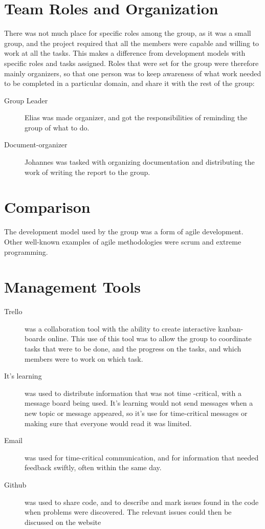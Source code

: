 \section{Team Roles and Organization}
There was not much place for specific roles among the group, as it was a small group, and the project required that all the members were capable and willing to work at all the tasks. This makes a difference from development models with specific roles and tasks assigned. Roles that were set for the group were therefore mainly organizers, so that one person was to keep awareness of what work needed to be completed in a particular domain, and share it with the rest of the group:

\begin{description}

\item[Group Leader] Elias was made organizer, and got the responsibilities of reminding the group of what to do.
\item[Document-organizer] Johannes was tasked with organizing documentation and distributing the work of writing the report to the group. 
\end{description}

\section{Comparison}
The development model used by the group was a form of agile development. Other well-known examples of agile methodologies were scrum and extreme programming. 

\section{Management Tools}
 
\begin{description}
\item[Trello] was a collaboration tool with the ability to create interactive kanban-boards online. This use of this tool was to allow the group to coordinate tasks that were to be done, and the progress on the tasks, and which members were to work on which task. 
\item[It's learning] was used to distribute information that was not time -critical, with a message board being used. It's learning would not send messages when a new topic or message appeared, so it's use for time-critical messages or making sure that everyone would read it was limited. 
\item[Email] was used for time-critical communication, and for information that needed feedback swiftly, often within the same day.
\item[Github] was used to share code, and to describe and mark issues found in the code when problems were discovered. The relevant issues could then be discussed on the website
\end{description}
